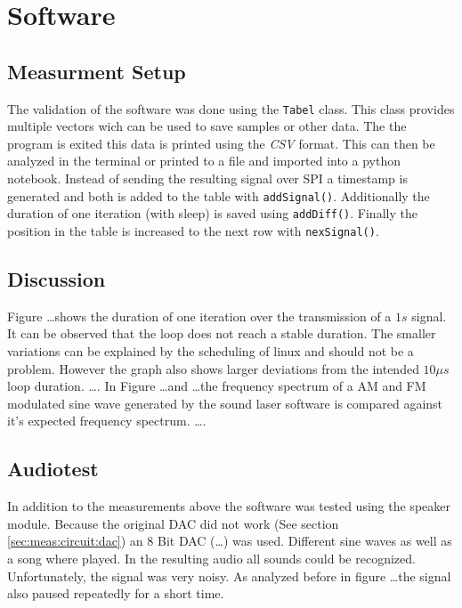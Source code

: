 \section{Software}

\subsection{Measurment Setup}

The validation of the software was done using the \lstinline{Tabel} class. This class provides multiple vectors wich can be used to save samples or other data. The the program is exited this data is printed using the \textit{CSV} format. This can then be analyzed in the terminal or printed to a file and imported into a python notebook.\p
%
Instead of sending the resulting signal over SPI a timestamp is generated and both is added to the table with \lstinline{addSignal()}. Additionally the duration of one iteration (with sleep) is saved using \lstinline{addDiff()}. Finally the position in the table is increased to the next row with \lstinline{nexSignal()}.

\subsection{Discussion}

Figure \dots shows the duration of one iteration over the transmission of a $1s$ signal. It can be observed that the loop does not reach a stable duration. The smaller variations can be explained by the scheduling of linux and should not be a problem. However the graph also shows larger deviations from the intended $10\mu s$ loop duration. \dots.
%
In Figure \dots and \dots the frequency spectrum of a AM and FM modulated sine wave generated by the sound laser software is compared against it's expected frequency spectrum. \dots.
%
\subsection{Audiotest}

In addition to the measurements above the software was tested using the speaker module. Because the original DAC did not work (See section \ref{sec:meas:circuit:dac}) an 8 Bit DAC (\dots) was used. Different sine waves as well as a song where played. In the resulting audio all sounds could be recognized. Unfortunately, the signal was very noisy. As analyzed before in figure \dots the signal also paused repeatedly for a short time.